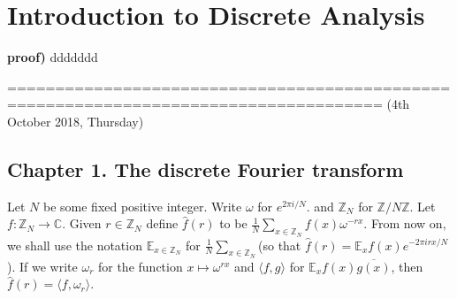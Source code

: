 \documentclass[10pt,a4paper]{report}
\renewcommand{\hat}{\widehat}
\newenvironment{proof}
{\begin{changemargin}{1cm}{0.5cm}
	}%
	{\end{changemargin}
}
\begin{document}
\newcommand{\thm}{\textbf{Theorem) }}
\newcommand{\thmnum}[1]{\textbf{Theorem #1) }}
\newcommand{\defi}{\textbf{Definition) }}
\newcommand{\lem}{\textbf{Lemma) }}
\newcommand{\lemnum}[1]{\textbf{Lemma #1) }}
\newcommand{\prop}{\textbf{Proposition) }}
\newcommand{\propnum}[1]{\textbf{Proposition #1) }}
\newcommand{\cor}{\textbf{Corollary) }}
\newcommand{\cornum}[1]{\textbf{Corollary #1) }}


\newcommand{\pf}{\textbf{proof) }}
\newcommand{\eop}{\hfill  \textsl{(End of proof)} $\square$} %


\newcommand{\lap}{\triangle} %
\newcommand{\s}{\vspace{10pt}}
\newcommand{\bull}{$\bullet$}
\newcommand{\sta}{$\star$}
\newcommand{\reals}{\mathbb{R}}

\newcommand{\intN}{\mathbb{Z}_N}
\newcommand{\norms}[2]{\parallel #1 \parallel_{#2}}
\newcommand{\avg}{\mathbb{E}}
\newcommand{\prob}{\mathbb{P}}
\newcommand{\osc}{\text{\osc}}

\newcommand{\newday}{================================================================}

\renewcommand{\bar}{\overline}

\setlength\parindent{0pt}

\chapter*{Introduction to Discrete Analysis}
\s

\begin{proof}
\pf ddddddd
\end{proof}


=====================================================================================
(4th October 2018, Thursday)
\s

\section*{Chapter 1. The discrete Fourier transform}
\s

Let $N$ be some fixed positive integer. Write $\omega$ for $e^{2\pi i /N}$. and $\mathbb{Z}_N$ for $\mathbb{Z}/N\mathbb{Z}$. Let $f: \mathbb{Z}_N \rightarrow \mathbb{C}$. Given $r \in \mathbb{Z}_N$ define $\hat{f}(r)$ to be $\frac{1}{N} \sum_{x \in \mathbb{Z}_N} f(x) \omega^{-rx}$. From now on, we shall use the notation $\mathbb{E}_{x\in \mathbb{Z}_N}$ for $\frac{1}{N} \sum_{x \in \mathbb{Z}_N}$(so that $\hat{f}(r)  = \mathbb{E}_x f(x)e^{-2\pi i rx/N}$). If we write $\omega_r$ for the function $x\mapsto \omega^{rx}$ and $\langle f,g \rangle$ for $\mathbb{E}_x f(x)\bar{g(x)}$, then $\hat{f}(r) = \langle f,\omega_r \rangle$.
\s
\end{document}
